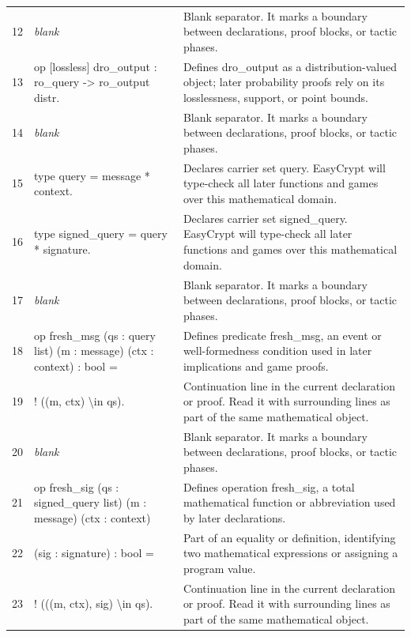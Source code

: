 \documentclass[10pt]{article}
\begin{document}
\begin{longtable}{r L{0.53\textwidth} L{0.37\textwidth}}
12 & {\ttfamily\scriptsize \emph{blank}} & Blank separator.  It marks a boundary between declarations, proof blocks, or tactic phases. \\
13 & {\ttfamily\scriptsize op [lossless] dro\_output : ro\_query -> ro\_output distr.} & Defines dro\_output as a distribution-valued object; later probability proofs rely on its losslessness, support, or point bounds. \\
14 & {\ttfamily\scriptsize \emph{blank}} & Blank separator.  It marks a boundary between declarations, proof blocks, or tactic phases. \\
15 & {\ttfamily\scriptsize type query = message * context.} & Declares carrier set query.  EasyCrypt will type-check all later functions and games over this mathematical domain. \\
16 & {\ttfamily\scriptsize type signed\_query = query * signature.} & Declares carrier set signed\_query.  EasyCrypt will type-check all later functions and games over this mathematical domain. \\
17 & {\ttfamily\scriptsize \emph{blank}} & Blank separator.  It marks a boundary between declarations, proof blocks, or tactic phases. \\
18 & {\ttfamily\scriptsize op fresh\_msg (qs : query list) (m : message) (ctx : context) : bool =} & Defines predicate fresh\_msg, an event or well-formedness condition used in later implications and game proofs. \\
19 & {\ttfamily\scriptsize   ! ((m, ctx) \textbackslash{}in qs).} & Continuation line in the current declaration or proof.  Read it with surrounding lines as part of the same mathematical object. \\
20 & {\ttfamily\scriptsize \emph{blank}} & Blank separator.  It marks a boundary between declarations, proof blocks, or tactic phases. \\
21 & {\ttfamily\scriptsize op fresh\_sig (qs : signed\_query list) (m : message) (ctx : context)} & Defines operation fresh\_sig, a total mathematical function or abbreviation used by later declarations. \\
22 & {\ttfamily\scriptsize              (sig : signature) : bool =} & Part of an equality or definition, identifying two mathematical expressions or assigning a program value. \\
23 & {\ttfamily\scriptsize   ! (((m, ctx), sig) \textbackslash{}in qs).} & Continuation line in the current declaration or proof.  Read it with surrounding lines as part of the same mathematical object. \\

\end{longtable}
\end{document}
